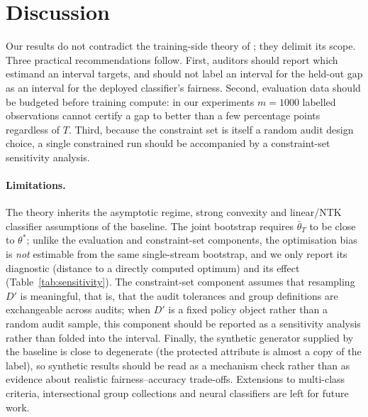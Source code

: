 \documentclass[10pt,twocolumn]{article}
\newcommand{\tbar}{\bar\theta}
\newcommand{\Dp}{D'}
\begin{document}
\section{Discussion}
\label{sec:discussion}

Our results do not contradict the training-side theory of \citet{roy2026uq}; they delimit its scope.
Three practical recommendations follow.  First, auditors should report which estimand an interval
targets, and should not label an interval for the held-out gap as an interval for the deployed
classifier's fairness.  Second, evaluation data should be budgeted before training compute: in our
experiments $m=1000$ labelled observations cannot certify a gap to better than a few percentage
points regardless of $T$.  Third, because the constraint set is itself a random audit design choice,
a single constrained run should be accompanied by a constraint-set sensitivity analysis.

\paragraph{Limitations.}
The theory inherits the asymptotic regime, strong convexity and linear/NTK classifier assumptions of
the baseline.  The joint bootstrap requires $\tbar_T$ to be close to $\theta^*$; unlike the evaluation
and constraint-set components, the optimisation bias is \emph{not} estimable from the same
single-stream bootstrap, and we only report its diagnostic (distance to a directly computed optimum)
and its effect (Table~\ref{tab:sensitivity}).  The constraint-set component assumes that resampling
$\Dp$ is meaningful, that is, that the audit tolerances and group definitions are exchangeable across
audits; when $\Dp$ is a fixed policy object rather than a random audit sample, this component should
be reported as a sensitivity analysis rather than folded into the interval.  Finally, the synthetic
generator supplied by the baseline is close to degenerate (the protected attribute is almost a copy
of the label), so synthetic results should be read as a mechanism check rather than as evidence about
realistic fairness--accuracy trade-offs.  Extensions to multi-class criteria, intersectional group
collections and neural classifiers are left for future work.
\end{document}
